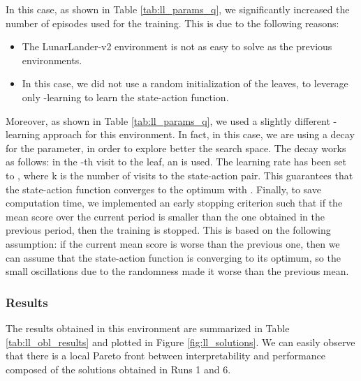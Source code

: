 \documentclass[review,english]{elsarticle}
\begin{document}
In this case, as shown in Table \ref{tab:ll_params_q}, we significantly increased the number of episodes used for the training. 
This is due to the following reasons:
\begin{itemize}
    \item The LunarLander-v2 environment is not as easy to solve as the previous environments.
    \item In this case, we did not use a random initialization of the leaves, to leverage only -learning to learn the state-action function.
\end{itemize}
Moreover, as shown in Table \ref{tab:ll_params_q}, we used a slightly different -learning approach for this environment.
In fact, in this case, we are using a decay for the  parameter, in order to explore better the search space. 
The decay works as follows: in the -th visit to the leaf, an  is used.
The learning rate has been set to , where k is the number of visits to the state-action pair.
This guarantees that the state-action function converges to the optimum with .
Finally, to save computation time, we implemented an early stopping criterion such that if the mean score over the current period is smaller than the one obtained in the previous period, then the training is stopped.
This is based on the following assumption: if the current mean score is worse than the previous one, then we can assume that the state-action function is converging to its optimum, so the small oscillations due to the randomness made it worse than the previous mean.

\subsubsection{Results}
The results obtained in this environment are summarized in Table \ref{tab:ll_obl_results} and plotted in Figure \ref{fig:ll_solutions}.
We can easily observe that there is a local Pareto front between interpretability and performance composed of the solutions obtained in Runs 1 and 6.
\end{document}
